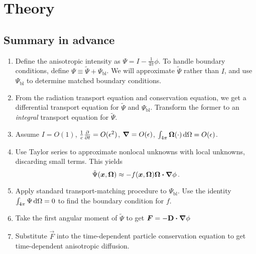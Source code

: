 \documentclass{beamer}
\begin{document}
\section{Theory}
\subsection{Summary in advance}
\begin{frame}
\begin{enumerate}
  \item Define the anisotropic intensity as $\Psi = I -
    \frac{1}{4\pi}\phi$. To handle boundary conditions, define $\Psi
    \equiv \tilde \Psi + \Psi_\mathrm{bl}$. We will approximate $\tilde \Psi$
    rather than $I$, and use $\Psi_\mathrm{bl}$ to determine matched boundary
    conditions.
  \item From the radiation transport equation and conservation equation, we get
    a differential transport equation for $\tilde \Psi$ and $\Psi_\mathrm{bl}$.
    Transform the former to an \emph{integral} transport equation for $\tilde
    \Psi$.
  \item Assume $I=O(1)$, $\frac1c\frac{\partial }{\partial t}=O(\epsilon^2)$, $\bm{\nabla} =
    O(\epsilon)$, $\int_{4\pi} \bm{\Omega} (\cdot) \mathop{}\!\mathrm{d}\Omega = O(\epsilon)$.
  \item Use Taylor series to approximate nonlocal unknowns with local
    unknowns, discarding small terms. This yields
    \begin{equation*}
      \tilde \Psi(\bm{x}, \bm{\Omega})
      \approx - f(\bm{x}, \bm{\Omega})  \bm{\Omega} \bm{\cdot} \bm{\nabla} \phi\,.
    \end{equation*}
  \item Apply standard transport-matching procedure to $\Psi_\mathrm{bl}$. Use
    the identity $\int_{4\pi} \Psi \mathop{}\!\mathrm{d}\Omega=0$ to find the boundary condition
    for $f$.
  \item Take the first angular moment of $\tilde \Psi$ to get
    $\bm{F}=-\mathbf{D} \bm{\cdot} \bm{\nabla} \phi$
  \item Substitute $\vec{F}$ into the time-dependent particle
    conservation equation to get time-dependent anisotropic diffusion.
\end{enumerate}
\end{frame}
\end{document}
